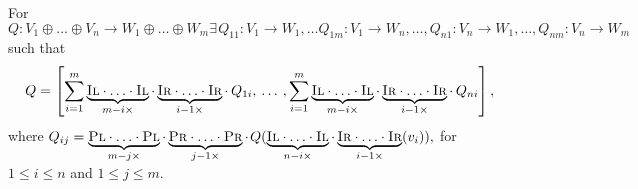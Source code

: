 \begin{definition} \label{def:gen_norm_ops}
  For $Q: V_1 \oplus \ldots \oplus V_n  \rightarrow W_1 \oplus \ldots \oplus W_m \exists \hspace{1pt} Q_{11}:V_1 \rightarrow W_1, \ldots Q_{1m}: V_1 \rightarrow W_n, \ldots,  Q_{n1}:V_n \rightarrow W_1, \ldots,  Q_{nm}:V_n \rightarrow W_m $ such that 
  $$Q= \left[ \sum_{i=1}^{m} \underbrace{\textsc{Il} \cdot \ldots \cdot \textsc{Il}}_{m-i \times } \cdot  \underbrace{\textsc{Ir} \cdot \ldots \cdot \textsc{Ir}}_{i-1 \times } \cdot  \hspace{2pt} Q_{1i},  \hspace{2pt} \ldots  \hspace{2pt}, \sum_{i=1}^{m} \underbrace{\textsc{Il} \cdot \ldots \cdot \textsc{Il}}_{m-i \times } \cdot  \underbrace{\textsc{Ir} \cdot \ldots \cdot \textsc{Ir}}_{i-1 \times } \cdot  \hspace{2pt} Q_{ni}  \right],$$  
  where $Q_{ij} = \underbrace{\textsc{Pl} \cdot \ldots \cdot \textsc{Pl}}_{m-j \times  }  \cdot \underbrace{\textsc{Pr} \cdot \ldots \cdot \textsc{Pr}}_{j-1 \times} \cdot \hspace{1pt} Q (\underbrace{\textsc{Il} \cdot \ldots \cdot \textsc{Il}}_{n-i \times }  \cdot  \underbrace{\textsc{Ir} \cdot \ldots \cdot \textsc{Ir}}_{i-1 \times } (v_i)),  $ for $1 \leq i \leq n$ and $1 \leq j \leq m$. 
  

\end{definition}
